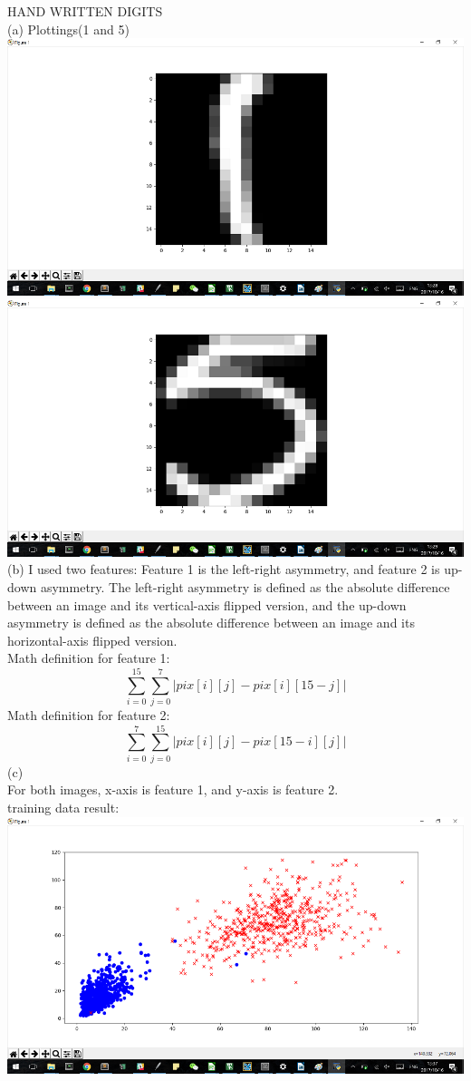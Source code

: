 \documentclass[12pt]{article}
\begin{document}
HAND WRITTEN DIGITS\\%
(a) Plottings(1 and 5)\\
\includegraphics[scale=0.8]{1}\\
\includegraphics[scale=0.8]{5}\\
(b) I used two features: Feature 1 is the left-right asymmetry, and feature 2 is up-down asymmetry. 
The left-right asymmetry is defined as the absolute difference between an image and its vertical-axis flipped version, and the up-down asymmetry is defined as the absolute difference between an image and its horizontal-axis flipped version.\\
Math definition for feature 1:\\
$$\sum_{i=0}^{15}\sum_{j=0}^7|pix[i][j]-pix[i][15-j]|$$
Math definition for feature 2:\\
$$\sum_{i=0}^7\sum_{j=0}^{15}|pix[i][j]-pix[15-i][j]|$$
(c)\\
For both images, x-axis is feature 1, and y-axis is feature 2.\\
training data result:\\
\includegraphics[scale=0.8]{train1_5}\\
\end{document}
